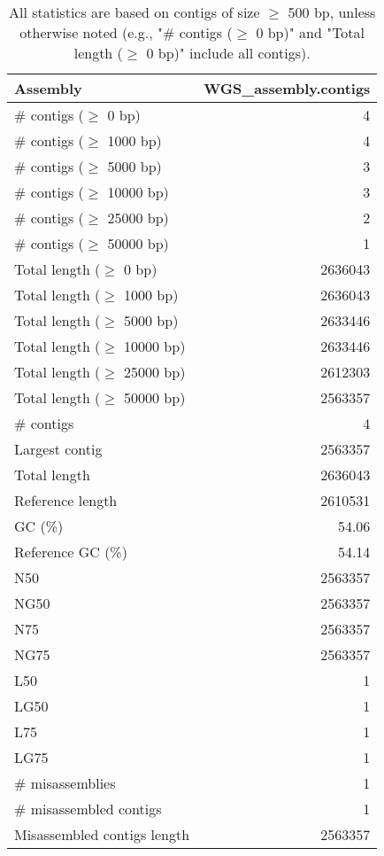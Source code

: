 \documentclass[12pt,a4paper]{article}
\begin{document}
\begin{table}[ht]
\begin{center}
\caption{All statistics are based on contigs of size $\geq$ 500 bp, unless otherwise noted (e.g., "\# contigs ($\geq$ 0 bp)" and "Total length ($\geq$ 0 bp)" include all contigs).}
\begin{tabular}{|l*{1}{|r}|}
\hline
Assembly & WGS\_assembly.contigs \\ \hline
\# contigs ($\geq$ 0 bp) & 4 \\ \hline
\# contigs ($\geq$ 1000 bp) & 4 \\ \hline
\# contigs ($\geq$ 5000 bp) & 3 \\ \hline
\# contigs ($\geq$ 10000 bp) & 3 \\ \hline
\# contigs ($\geq$ 25000 bp) & 2 \\ \hline
\# contigs ($\geq$ 50000 bp) & 1 \\ \hline
Total length ($\geq$ 0 bp) & 2636043 \\ \hline
Total length ($\geq$ 1000 bp) & 2636043 \\ \hline
Total length ($\geq$ 5000 bp) & 2633446 \\ \hline
Total length ($\geq$ 10000 bp) & 2633446 \\ \hline
Total length ($\geq$ 25000 bp) & 2612303 \\ \hline
Total length ($\geq$ 50000 bp) & 2563357 \\ \hline
\# contigs & 4 \\ \hline
Largest contig & 2563357 \\ \hline
Total length & 2636043 \\ \hline
Reference length & 2610531 \\ \hline
GC (\%) & 54.06 \\ \hline
Reference GC (\%) & 54.14 \\ \hline
N50 & 2563357 \\ \hline
NG50 & 2563357 \\ \hline
N75 & 2563357 \\ \hline
NG75 & 2563357 \\ \hline
L50 & 1 \\ \hline
LG50 & 1 \\ \hline
L75 & 1 \\ \hline
LG75 & 1 \\ \hline
\# misassemblies & 1 \\ \hline
\# misassembled contigs & 1 \\ \hline
Misassembled contigs length & 2563357 \\ \hline

\end{tabular}
\end{center}
\end{table}
\end{document}
